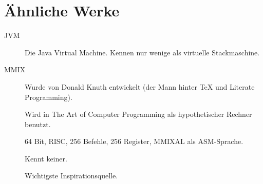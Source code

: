 \section{Ähnliche Werke}

\begin{frame}{\insertsection}
 \begin{description}
  \item[JVM]
    Die Java Virtual Machine. 
    Kennen nur wenige als virtuelle Stackmaschine.
  \item[MMIX]
    Wurde von Donald Knuth entwickelt 
    (der Mann hinter \TeX{} und Literate Programming).
    
    Wird in \glqq The Art of Computer Programming\grqq{} als hypothetischer
    Rechner benutzt.

    64 Bit, RISC, 256 Befehle, 256 Register, MMIXAL als ASM-Sprache.
    
    Kennt keiner.
    
    Wichtigste Inspirationsquelle.
 \end{description}

\end{frame}




